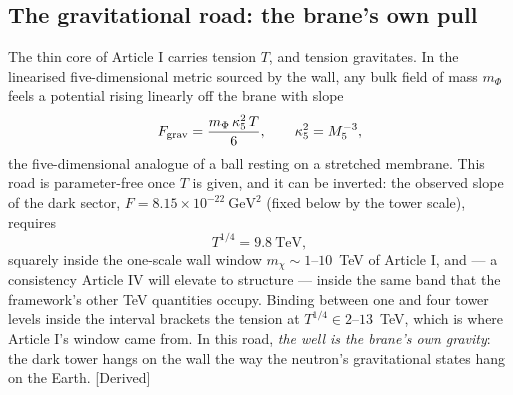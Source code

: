 \subsection{The gravitational road: the brane's own pull}
The thin core of Article I carries tension $T$, and tension gravitates. In the linearised five-dimensional metric sourced by the wall, any bulk field of mass $m_{\Phi}$ feels a potential rising linearly off the brane with slope
\begin{equation}
F_{\rm grav}=\frac{m_{\Phi}\,\kappa_{5}^{2}\,T}{6},\qquad \kappa_{5}^{2}=M_5^{-3},
\label{eq:gravslope}
\end{equation}
the five-dimensional analogue of a ball resting on a stretched membrane. This road is parameter-free once $T$ is given, and it can be inverted: the observed slope of the dark sector, $F=8.15\times10^{-22}~\mathrm{GeV}^{2}$ (fixed below by the tower scale), requires
\begin{equation}
T^{1/4}=9.8~\mathrm{TeV},
\end{equation}
squarely inside the one-scale wall window $m_{\chi}\sim1$--$10$~TeV of Article I, and --- a consistency Article IV will elevate to structure --- inside the same band that the framework's other TeV quantities occupy. Binding between one and four tower levels inside the interval brackets the tension at $T^{1/4}\in2$--$13$~TeV, which is where Article I's window came from. In this road, \emph{the well is the brane's own gravity}: the dark tower hangs on the wall the way the neutron's gravitational states hang on the Earth. [Derived]

